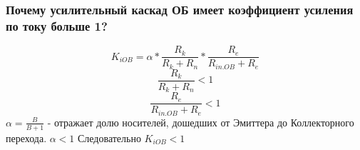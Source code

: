 \subsubsection{Почему усилительный каскад ОБ имеет коэффициент усиления по току больше 1?}

$$
K_{iOB}=\alpha*\frac{R_{k}}{R_{k}+R_{n}}*\frac{R_{e}}{R_{in.OB}+R_{e}}
$$
$$
\frac{R_{k}}{R_{k}+R_{n}}<1
$$
$$
\frac{R_{e}}{R_{in.OB}+R_{e}}<1
$$
$\alpha=\frac{B}{B+1}$ - отражает долю носителей, дошедших от Эмиттера до Коллекторного перехода.
$\alpha<1$
Следовательно $K_{iOB}<1$
